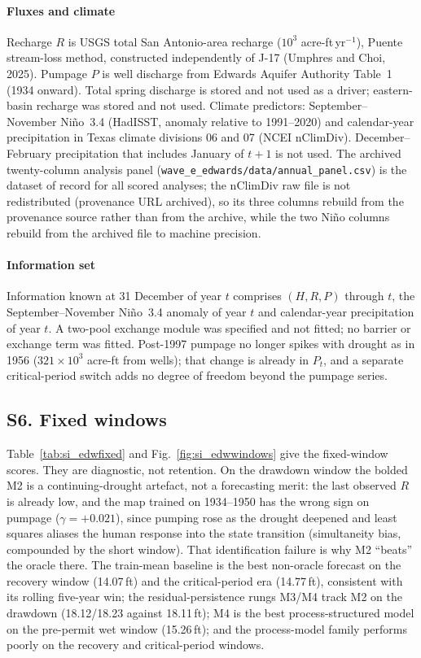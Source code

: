 \documentclass[11pt]{article}
\begin{document}
\paragraph{Fluxes and climate} Recharge $R$ is USGS total San Antonio-area recharge ($10^3$ acre-ft\,yr$^{-1}$), Puente stream-loss method, constructed independently of J-17 (Umphres and Choi, 2025). Pumpage $P$ is well discharge from Edwards Aquifer Authority Table~1 (1934 onward). Total spring discharge is stored and not used as a driver; eastern-basin recharge was stored and not used. Climate predictors: September--November Ni\~no~3.4 (HadISST, anomaly relative to 1991--2020) and calendar-year precipitation in Texas climate divisions 06 and 07 (NCEI nClimDiv). December--February precipitation that includes January of $t+1$ is not used. The archived twenty-column analysis panel (\texttt{wave\_e\_edwards/data/annual\_panel.csv}) is the dataset of record for all scored analyses; the nClimDiv raw file is not redistributed (provenance URL archived), so its three columns rebuild from the provenance source rather than from the archive, while the two Ni\~no columns rebuild from the archived file to machine precision.

\paragraph{Information set} Information known at 31 December of year $t$ comprises $(H,R,P)$ through $t$, the September--November Ni\~no~3.4 anomaly of year $t$ and calendar-year precipitation of year $t$. A two-pool exchange module was specified and not fitted; no barrier or exchange term was fitted. Post-1997 pumpage no longer spikes with drought as in 1956 ($321\times10^3$ acre-ft from wells); that change is already in $P_t$, and a separate critical-period switch adds no degree of freedom beyond the pumpage series.

\FloatBarrier
\subsection{S6. Fixed windows}\label{si:edwfixed}

Table~\ref{tab:si_edwfixed} and Fig.~\ref{fig:si_edwwindows} give the fixed-window scores. They are diagnostic, not retention. On the drawdown window the bolded M2 is a continuing-drought artefact, not a forecasting merit: the last observed $R$ is already low, and the map trained on 1934--1950 has the wrong sign on pumpage ($\gamma=+0.021$), since pumping rose as the drought deepened and least squares aliases the human response into the state transition (simultaneity bias, compounded by the short window). That identification failure is why M2 ``beats'' the oracle there. The train-mean baseline is the best non-oracle forecast on the recovery window (14.07\,ft) and the critical-period era (14.77\,ft), consistent with its rolling five-year win; the residual-persistence rungs M3/M4 track M2 on the drawdown (18.12/18.23 against 18.11\,ft); M4 is the best process-structured model on the pre-permit wet window (15.26\,ft); and the process-model family performs poorly on the recovery and critical-period windows.
\end{document}
